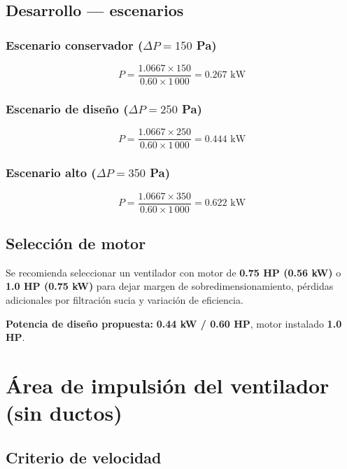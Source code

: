 \documentclass[12pt,a4paper]{article}
\begin{document}
\subsection{Desarrollo --- escenarios}

\subsubsection{Escenario conservador (\texorpdfstring{$\Delta P = 150$}{Delta P = 150} Pa)}

\[
P = \frac{1.0667 \times 150}{0.60 \times 1\,000} = 0.267 \text{ kW}
\]

\subsubsection{Escenario de diseño (\texorpdfstring{$\Delta P = 250$}{Delta P = 250} Pa)}

\[
P = \frac{1.0667 \times 250}{0.60 \times 1\,000} = 0.444 \text{ kW}
\]

\subsubsection{Escenario alto (\texorpdfstring{$\Delta P = 350$}{Delta P = 350} Pa)}

\[
P = \frac{1.0667 \times 350}{0.60 \times 1\,000} = 0.622 \text{ kW}
\]

\subsection{Selección de motor}

Se recomienda seleccionar un ventilador con motor de \textbf{0.75 HP (0.56 kW)} o \textbf{1.0 HP (0.75 kW)} para dejar margen de sobredimensionamiento, pérdidas adicionales por filtración sucia y variación de eficiencia.

\textbf{Potencia de diseño propuesta:} \textbf{0.44 kW / 0.60 HP}, motor instalado \textbf{1.0 HP}.

\section{Área de impulsión del ventilador (sin ductos)}

\subsection{Criterio de velocidad}
\end{document}
